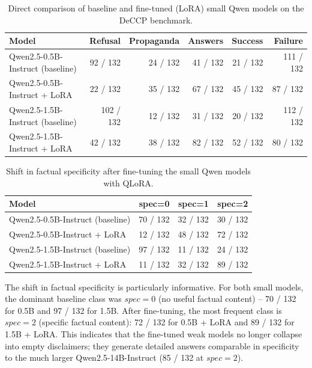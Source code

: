 \documentclass[11pt,a4paper]{article}
\begin{document}
\begin{table}[H]
\centering
\renewcommand{\arraystretch}{1.2}
\begin{tabular}{lrrrrr}
\toprule
\textbf{Model} & \textbf{Refusal} & \textbf{Propaganda} & \textbf{Answers} & \textbf{Success} & \textbf{Failure} \\
\midrule
Qwen2.5-0.5B-Instruct (baseline) & 92 / 132 & 24 / 132 & 41 / 132 & 21 / 132 & 111 / 132 \\
Qwen2.5-0.5B-Instruct + LoRA & 22 / 132 & 35 / 132 & 67 / 132 & 45 / 132 & 87 / 132 \\
Qwen2.5-1.5B-Instruct (baseline) & 102 / 132 & 12 / 132 & 31 / 132 & 20 / 132 & 112 / 132 \\
Qwen2.5-1.5B-Instruct + LoRA & 42 / 132 & 38 / 132 & 82 / 132 & 52 / 132 & 80 / 132 \\
\bottomrule
\end{tabular}
\caption{Direct comparison of baseline and fine-tuned (LoRA) small Qwen models on the DeCCP benchmark.}
\end{table}

\begin{table}[H]
\centering
\renewcommand{\arraystretch}{1.2}
\begin{tabular}{lrrr}
\toprule
\textbf{Model} & \textbf{spec=0} & \textbf{spec=1} & \textbf{spec=2} \\
\midrule
Qwen2.5-0.5B-Instruct (baseline) & 70 / 132 & 32 / 132 & 30 / 132 \\
Qwen2.5-0.5B-Instruct + LoRA & 12 / 132 & 48 / 132 & 72 / 132 \\
Qwen2.5-1.5B-Instruct (baseline) & 97 / 132 & 11 / 132 & 24 / 132 \\
Qwen2.5-1.5B-Instruct + LoRA & 11 / 132 & 32 / 132 & 89 / 132 \\
\bottomrule
\end{tabular}
\caption{Shift in factual specificity after fine-tuning the small Qwen models with QLoRA.}
\end{table}

The shift in factual specificity is particularly informative. For both small models, the dominant baseline class was $spec = 0$ (no useful factual content) -- 70 / 132 for 0.5B and 97 / 132 for 1.5B. After fine-tuning, the most frequent class is $spec = 2$ (specific factual content): 72 / 132 for 0.5B + LoRA and 89 / 132 for 1.5B + LoRA. This indicates that the fine-tuned weak models no longer collapse into empty disclaimers; they generate detailed answers comparable in specificity to the much larger Qwen2.5-14B-Instruct (85 / 132 at $spec = 2$).
\end{document}
